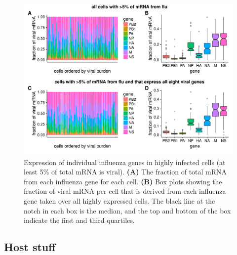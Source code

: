 \documentclass[9pt,lineno]{elife}
\begin{document}
\begin{figure}
\includegraphics[width=\linewidth]{figures/p_flu_expr.pdf}
\caption{\label{fig:fluexpr}
Expression of individual influenza genes in highly infected cells (at least 5\% of total mRNA is viral).
{\bf (A)} 
The fraction of total mRNA from each influenza gene for each cell.
{\bf (B)}
Box plots showing the fraction of viral mRNA per cell that is derived from each influenza gene taken over all highly expressed cells.
The black line at the notch in each box is the median, and the top and bottom of the box indicate the first and third quartiles.
}
\end{figure}

\subsection{Host stuff}
\end{document}
